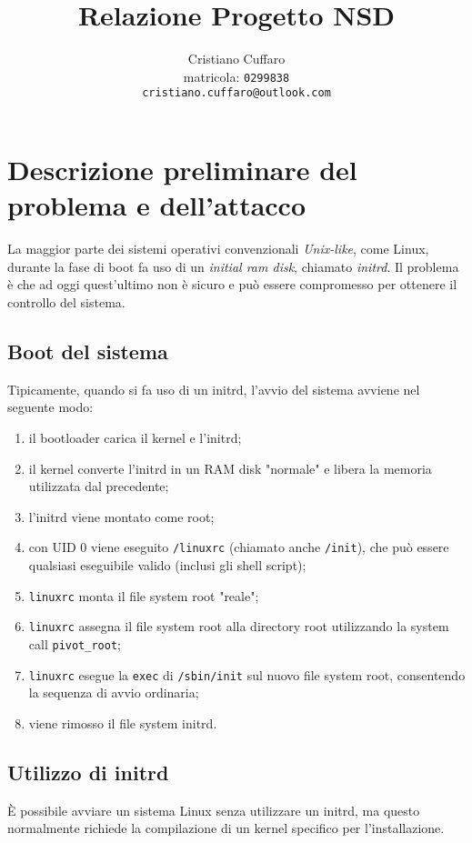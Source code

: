 \documentclass{article}
\begin{document}
\author{%
Cristiano Cuffaro \\
{\small matricola: \texttt{0299838}} \\
{\small \texttt{cristiano.cuffaro@outlook.com}}
}
\title{Relazione Progetto NSD}

\maketitle
\tableofcontents
\newpage

\section{Descrizione preliminare del problema e dell'attacco}
La maggior parte dei sistemi operativi convenzionali \textsl{Unix-like}, come Linux, durante la fase di boot fa uso di un \textsl{initial ram disk}, chiamato \textsl{initrd}. Il problema è che ad oggi quest'ultimo non è sicuro e può essere compromesso per ottenere il controllo del sistema.

\subsection{Boot del sistema}
Tipicamente, quando si fa uso di un initrd, l'avvio del sistema avviene nel seguente modo:
\begin{enumerate}
	\item il bootloader carica il kernel e l'initrd;
	\item il kernel converte l'initrd in un RAM disk "normale" e libera la memoria utilizzata dal precedente;
	\item l'initrd viene montato come root;
	\item con UID 0 viene eseguito \texttt{/linuxrc} (chiamato anche \texttt{/init}), che può essere qualsiasi eseguibile valido (inclusi gli shell script);
	\item \texttt{linuxrc} monta il file system root "reale";
	\item \texttt{linuxrc} assegna il file system root alla directory root utilizzando la system call \texttt{pivot\_root};
	\item \texttt{linuxrc} esegue la \texttt{exec} di \texttt{/sbin/init} sul nuovo file system root, consentendo la sequenza di avvio ordinaria;
	\item viene rimosso il file system initrd.
\end{enumerate}

\subsection{Utilizzo di initrd}
È possibile avviare un sistema Linux senza utilizzare un initrd, ma questo normalmente richiede la compilazione di un kernel specifico per l'installazione.
\end{document}
